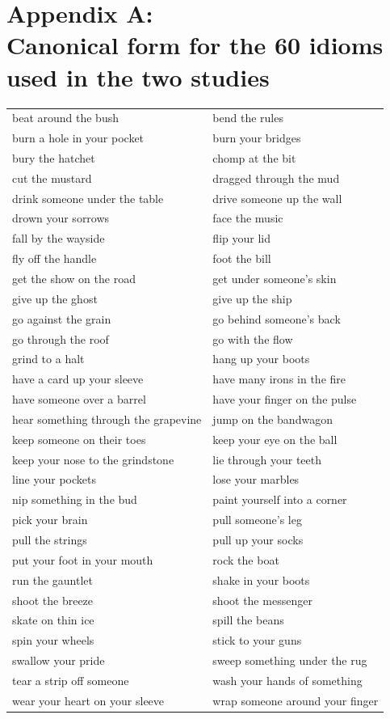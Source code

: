 \documentclass[output=paper,modfonts,nonflat]{langsci/langscibook}
\begin{document}
\newpage
\section*{Appendix A:\\ 
Canonical form for the 60 idioms used in the two studies}
\label{IdiomsAppendix}


\begin{table}
\begin{tabular}{ll}
beat around the bush & bend the rules\\
burn a hole in your pocket & burn your bridges\\
bury the hatchet & chomp at the bit\\
cut the mustard & dragged through the mud\\
drink someone under the table & drive someone up the wall\\
drown your sorrows & face the music\\
fall by the wayside & flip your lid\\
fly off the handle & foot the bill\\
get the show on the road & get under someone's skin\\
give up the ghost & give up the ship\\
go against the grain & go behind someone's back\\
go through the roof & go with the flow\\
grind to a halt & hang up your boots\\
have a card up your sleeve & have many irons in the fire\\
have someone over a barrel & have your finger on the pulse\\
hear something through the grapevine & jump on the bandwagon\\
keep someone on their toes & keep your eye on the ball\\
keep your nose to the grindstone & lie through your teeth\\
line your pockets & lose your marbles\\
nip something in the bud & paint yourself into a corner\\
pick your brain & pull someone's leg\\
pull the strings & pull up your socks\\
put your foot in your mouth & rock the boat\\
run the gauntlet & shake in your boots\\
shoot the breeze & shoot the messenger\\
skate on thin ice & spill the beans\\
spin your wheels & stick to your guns\\
swallow your pride & sweep something under the rug\\
tear a strip off someone & wash your hands of something\\
wear your heart on your sleeve & wrap someone around your finger\\
\end{tabular}
\end{table}



{\sloppy
\printbibliography
}
\end{document}
